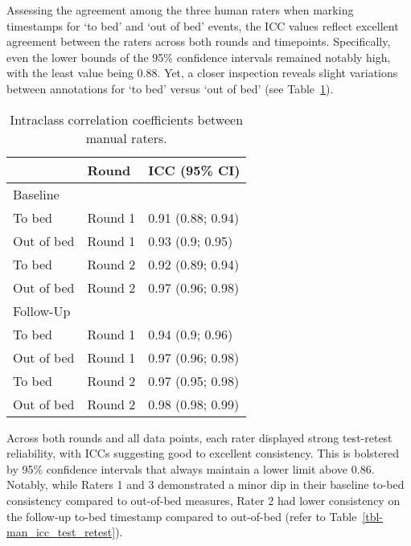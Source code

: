 \documentclass[
  10pt,
]{scrbook}
\begin{document}
\endgroup

Assessing the agreement among the three human raters when marking
timestamps for `to bed' and `out of bed' events, the ICC values reflect
excellent agreement between the raters across both rounds and
timepoints. Specifically, even the lower bounds of the 95\% confidence
intervals remained notably high, with the least value being 0.88. Yet, a
closer inspection reveals slight variations between annotations for `to
bed' versus `out of bed' (see Table~\ref{tbl-man_icc_man_man}).

\begingroup

\footnotesize

\hypertarget{tbl-man_icc_man_man}{}
\begin{longtable}{lll}
\caption{\label{tbl-man_icc_man_man}Intraclass correlation coefficients between manual raters. }\tabularnewline

\toprule
 & Round & ICC (95\% CI) \\ 
\midrule
\multicolumn{3}{l}{Baseline} \\ 
\midrule
To bed & Round 1 & 0.91 (0.88; 0.94) \\ 
Out of bed & Round 1 & 0.93 (0.9; 0.95) \\ 
To bed & Round 2 & 0.92 (0.89; 0.94) \\ 
Out of bed & Round 2 & 0.97 (0.96; 0.98) \\ 
\midrule
\multicolumn{3}{l}{Follow-Up} \\ 
\midrule
To bed & Round 1 & 0.94 (0.9; 0.96) \\ 
Out of bed & Round 1 & 0.97 (0.96; 0.98) \\ 
To bed & Round 2 & 0.97 (0.95; 0.98) \\ 
Out of bed & Round 2 & 0.98 (0.98; 0.99) \\ 
\bottomrule
\end{longtable}

\endgroup

Across both rounds and all data points, each rater displayed strong
test-retest reliability, with ICCs suggesting good to excellent
consistency. This is bolstered by 95\% confidence intervals that always
maintain a lower limit above 0.86. Notably, while Raters 1 and 3
demonstrated a minor dip in their baseline to-bed consistency compared
to out-of-bed measures, Rater 2 had lower consistency on the follow-up
to-bed timestamp compared to out-of-bed (refer to
Table~\ref{tbl-man_icc_test_retest}).

\begingroup
\end{document}
